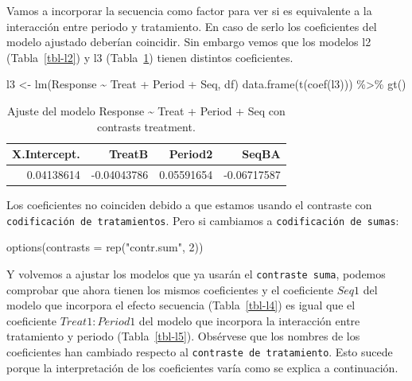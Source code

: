 \documentclass[
  12pt,
  a4paper,
  extrafontsizes,
  onecolumn,
  openright,
  table]{memoir}
\newenvironment{Shaded}{\begin{snugshade}}{\end{snugshade}}
\newcommand{\AttributeTok}[1]{\textcolor[rgb]{0.40,0.45,0.13}{#1}}
\newcommand{\DecValTok}[1]{\textcolor[rgb]{0.68,0.00,0.00}{#1}}
\newcommand{\FunctionTok}[1]{\textcolor[rgb]{0.28,0.35,0.67}{#1}}
\newcommand{\NormalTok}[1]{\textcolor[rgb]{0.00,0.23,0.31}{#1}}
\newcommand{\OtherTok}[1]{\textcolor[rgb]{0.00,0.23,0.31}{#1}}
\newcommand{\SpecialCharTok}[1]{\textcolor[rgb]{0.37,0.37,0.37}{#1}}
\newcommand{\StringTok}[1]{\textcolor[rgb]{0.13,0.47,0.30}{#1}}
\begin{document}
Vamos a incorporar la secuencia como factor para ver si es equivalente a
la interacción entre periodo y tratamiento. En caso de serlo los
coeficientes del modelo ajustado deberían coincidir. Sin embargo vemos
que los modelos l2 (Tabla~\ref{tbl-l2}) y l3 (Tabla~\ref{tbl-l3}) tienen
distintos coeficientes.

\scriptsize

\begin{Shaded}
\begin{Highlighting}[]
\NormalTok{l3 }\OtherTok{\textless{}{-}} \FunctionTok{lm}\NormalTok{(Response }\SpecialCharTok{\textasciitilde{}}\NormalTok{ Treat }\SpecialCharTok{+}\NormalTok{ Period }\SpecialCharTok{+}\NormalTok{ Seq, df)}
\FunctionTok{data.frame}\NormalTok{(}\FunctionTok{t}\NormalTok{(}\FunctionTok{coef}\NormalTok{(l3))) }\SpecialCharTok{\%\textgreater{}\%} \FunctionTok{gt}\NormalTok{()}
\end{Highlighting}
\end{Shaded}

\hypertarget{tbl-l3}{}
\begin{longtable}{rrrr}
\caption{\label{tbl-l3}Ajuste del modelo Response \textasciitilde{} Treat + Period + Seq con
contrasts treatment. }\tabularnewline

\toprule
X.Intercept. & TreatB & Period2 & SeqBA \\ 
\midrule
0.04138614 & -0.04043786 & 0.05591654 & -0.06717587 \\ 
\bottomrule
\end{longtable}

\normalsize

Los coeficientes no coinciden debido a que estamos usando el contraste
con \texttt{codificación\ de\ tratamientos}. Pero si cambiamos a
\texttt{codificación\ de\ sumas}:

\scriptsize

\begin{Shaded}
\begin{Highlighting}[]
\FunctionTok{options}\NormalTok{(}\AttributeTok{contrasts =} \FunctionTok{rep}\NormalTok{(}\StringTok{"contr.sum"}\NormalTok{, }\DecValTok{2}\NormalTok{))}
\end{Highlighting}
\end{Shaded}

\normalsize

Y volvemos a ajustar los modelos que ya usarán el
\texttt{contraste\ suma}, podemos comprobar que ahora tienen los mismos
coeficientes y el coeficiente \(Seq1\) del modelo que incorpora el
efecto secuencia (Tabla~\ref{tbl-l4}) es igual que el coeficiente
\(Treat1:Period1\) del modelo que incorpora la interacción entre
tratamiento y periodo (Tabla~\ref{tbl-l5}). Obsérvese que los nombres de
los coeficientes han cambiado respecto al
\texttt{contraste\ de\ tratamiento}. Esto sucede porque la
interpretación de los coeficientes varía como se explica a continuación.
\end{document}

